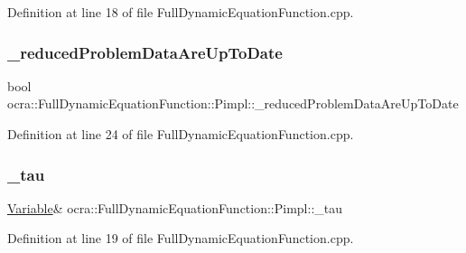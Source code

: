 Definition at line 18 of file Full\+Dynamic\+Equation\+Function.\+cpp.

\hypertarget{structFullDynamicEquationFunction_1_1Pimpl_a2712281ce355bde0730d888d8e92b2f8}{}\label{structFullDynamicEquationFunction_1_1Pimpl_a2712281ce355bde0730d888d8e92b2f8} 
\subsubsection{\texorpdfstring{\+\_\+reduced\+Problem\+Data\+Are\+Up\+To\+Date}{\_reducedProblemDataAreUpToDate}}
{\footnotesize\ttfamily bool ocra\+::\+Full\+Dynamic\+Equation\+Function\+::\+Pimpl\+::\+\_\+reduced\+Problem\+Data\+Are\+Up\+To\+Date}



Definition at line 24 of file Full\+Dynamic\+Equation\+Function.\+cpp.

\hypertarget{structFullDynamicEquationFunction_1_1Pimpl_a952d62f65cebf67e50d0d6a091f937c4}{}\label{structFullDynamicEquationFunction_1_1Pimpl_a952d62f65cebf67e50d0d6a091f937c4} 
\subsubsection{\texorpdfstring{\+\_\+tau}{\_tau}}
{\footnotesize\ttfamily \hyperlink{classocra_1_1Variable}{Variable}\& ocra\+::\+Full\+Dynamic\+Equation\+Function\+::\+Pimpl\+::\+\_\+tau}



Definition at line 19 of file Full\+Dynamic\+Equation\+Function.\+cpp.

\hypertarget{structFullDynamicEquationFunction_1_1Pimpl_a7a8eb59e31eca20e45bd63f2975ff27b}{}\label{structFullDynamicEquationFunction_1_1Pimpl_a7a8eb59e31eca20e45bd63f2975ff27b} 
